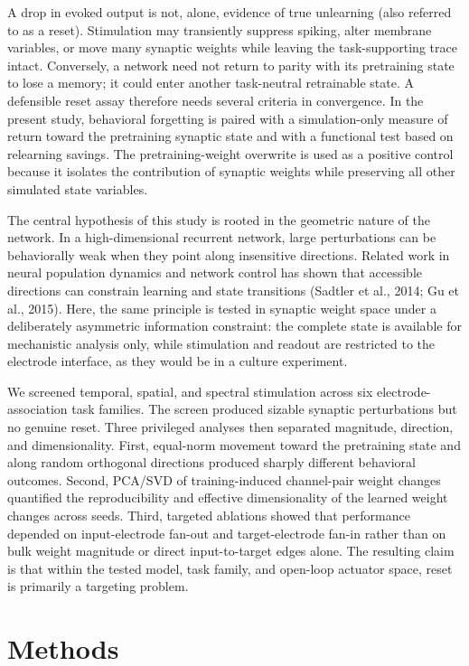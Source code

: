 \documentclass{article}
\begin{document}
A drop in evoked output is not, alone, evidence of true unlearning (also referred to as a reset). Stimulation may transiently suppress spiking, alter membrane variables, or move many synaptic weights while leaving the task-supporting trace intact. Conversely, a network need not return to parity with its pretraining state to lose a memory; it could enter another task-neutral retrainable state. A defensible reset assay therefore needs several criteria in convergence. In the present study, behavioral forgetting is paired with a simulation-only measure of return toward the pretraining synaptic state and with a functional test based on relearning savings. The pretraining-weight overwrite is used as a positive control because it isolates the contribution of synaptic weights while preserving all other simulated state variables.

The central hypothesis of this study is rooted in the geometric nature of the network. In a high-dimensional recurrent network, large perturbations can be behaviorally weak when they point along insensitive directions. Related work in neural population dynamics and network control has shown that accessible directions can constrain learning and state transitions (Sadtler et al., 2014; Gu et al., 2015). Here, the same principle is tested in synaptic weight space under a deliberately asymmetric information constraint: the complete state is available for mechanistic analysis only, while stimulation and readout are restricted to the electrode interface, as they would be in a culture experiment.

We screened temporal, spatial, and spectral stimulation across six electrode-association task families. The screen produced sizable synaptic perturbations but no genuine reset. Three privileged analyses then separated magnitude, direction, and dimensionality. First, equal-norm movement toward the pretraining state and along random orthogonal directions produced sharply different behavioral outcomes. Second, PCA/SVD of training-induced channel-pair weight changes quantified the reproducibility and effective dimensionality of the learned weight changes across seeds. Third, targeted ablations showed that performance depended on input-electrode fan-out and target-electrode fan-in rather than on bulk weight magnitude or direct input-to-target edges alone. The resulting claim is that within the tested model, task family, and open-loop actuator space, reset is primarily a targeting problem.


\section{Methods}
\end{document}
